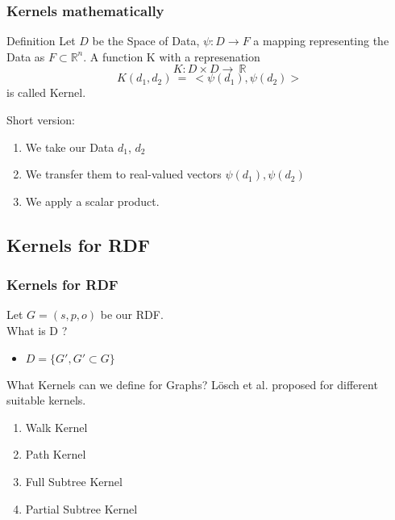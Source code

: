 \begin{frame}[fragile,t]
\frametitle{Kernels mathematically}
\begin{comment}
We want to consider a certain class of Machine learing Algorithms: Kernel based ones.
\end{comment}


\begin{comment}
\begin{itemize}

\item ... summarize Data-pairs as a single scalar value $K(d,d)\in \mathbb{R}$
\pause
\item ... can be used to embed Data in higher-spaced rooms.
\pause
\item ... can be used directly for machine-learning concepts like NNS, some NN, SVMs.
\pause
\end{itemize}
\end{comment}
\begin{block}{Definition}
Let $D$ be the Space of Data, $\psi: D \rightarrow F$ a mapping representing the Data as $F \subset \mathbb{R}^n$. A function K with a represenation \\

\[ K: D \times  D  \rightarrow \ \mathbb{R}\]
\[ K(d_1,d_2)\ =\ <\psi(d_1),\psi(d_2)> \]
is called Kernel.
\end{block}

Short version: 
\begin{enumerate}
\item We take our Data $d_1$, $d_2$
\item We transfer them to real-valued vectors $\psi(d_1),\psi(d_2)$
\item We apply a scalar product.
\end{enumerate}

\end{frame}


\subsection{Kernels for RDF}
\begin{frame}[fragile, t]
\frametitle{Kernels for RDF}
Let $G = (s,p,o)$ be our RDF. \\
\pause
What is D ?
\begin{itemize} \pause
\item $D = \{G', G' \subset G\}$
\end{itemize}
What Kernels can we define for Graphs? \pause
\vspace{5pt}
Lösch et al. proposed for different suitable kernels.
\begin{enumerate}
\item Walk Kernel
\item Path Kernel
\item Full Subtree Kernel
\item Partial Subtree Kernel
\end{enumerate}
\end{frame}

